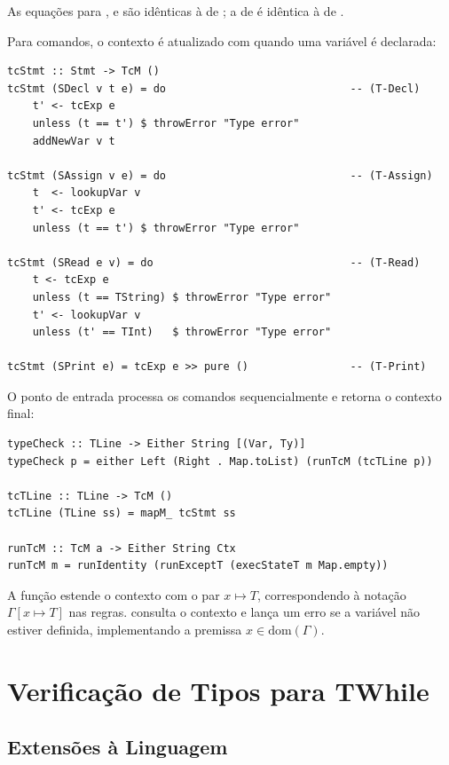 As equações para \haskell{:*:},
\haskell{:-:} e \haskell{:/:} são
idênticas à de \haskell{:+:}; a de
\haskell{:=:} é idêntica à de \haskell{:<:}.

Para comandos, o contexto é atualizado com
 quando uma variável é declarada:

\begin{verbatim}
tcStmt :: Stmt -> TcM ()
tcStmt (SDecl v t e) = do                             -- (T-Decl)
    t' <- tcExp e
    unless (t == t') $ throwError "Type error"
    addNewVar v t

tcStmt (SAssign v e) = do                             -- (T-Assign)
    t  <- lookupVar v
    t' <- tcExp e
    unless (t == t') $ throwError "Type error"

tcStmt (SRead e v) = do                               -- (T-Read)
    t <- tcExp e
    unless (t == TString) $ throwError "Type error"
    t' <- lookupVar v
    unless (t' == TInt)   $ throwError "Type error"

tcStmt (SPrint e) = tcExp e >> pure ()                -- (T-Print)
\end{verbatim}

O ponto de entrada processa os comandos sequencialmente e retorna o
contexto final:

\begin{verbatim}
typeCheck :: TLine -> Either String [(Var, Ty)]
typeCheck p = either Left (Right . Map.toList) (runTcM (tcTLine p))

tcTLine :: TLine -> TcM ()
tcTLine (TLine ss) = mapM_ tcStmt ss

runTcM :: TcM a -> Either String Ctx
runTcM m = runIdentity (runExceptT (execStateT m Map.empty))
\end{verbatim}

A função  estende o contexto com o par \(x
\mapsto T\), correspondendo à notação \(\Gamma[x \mapsto T]\) nas
regras.  consulta o contexto e
lança um erro se a variável não estiver definida, implementando a
premissa \(x \in \mathrm{dom}(\Gamma)\).

\section{Verificação de Tipos para TWhile}

\subsection{Extensões à Linguagem}

